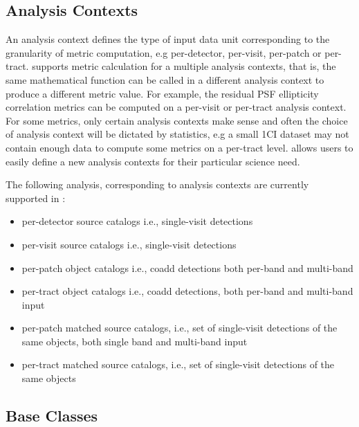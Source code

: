\subsection{Analysis Contexts} \label{ssec:contexts}

An analysis context defines the type of input data unit corresponding to the granularity of metric computation, e.g per-detector, per-visit, per-patch or per-tract.
\faro supports metric calculation for a multiple analysis contexts, that is, the same mathematical function can be called in a different analysis context to produce a different metric value. 
For example, the residual PSF ellipticity correlation metrics can be computed on a per-visit or per-tract analysis context. 
For some metrics, only certain analysis contexts make sense and often the choice of analysis context will be dictated by statistics, e.g a small 1\degsq CI dataset may not contain enough data to compute some metrics on a per-tract level. 
\faro allows users to easily define a new analysis contexts for their particular science need. 

The following analysis, corresponding to analysis contexts  are currently supported in \faro:
\begin{itemize}
\item per-detector source catalogs i.e., single-visit detections
\item per-visit source catalogs i.e., single-visit detections
\item per-patch object catalogs i.e., coadd detections both per-band and multi-band
\item per-tract object catalogs i.e., coadd detections, both per-band and multi-band input
\item per-patch matched source catalogs, i.e., set of single-visit detections of the same objects, both single band and multi-band input
\item per-tract matched source catalogs, i.e., set of single-visit detections of the same objects 
\end{itemize}


\subsection{Base Classes} \label{ssec:baseclasses}

